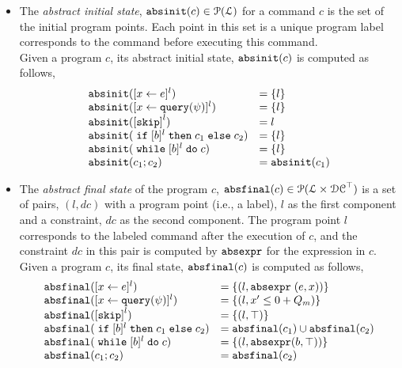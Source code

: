 \begin{itemize}
  \item The \emph{abstract initial state}, $\mathtt{abs}{\mathtt{init}}(c) \in \mathcal{P}(\mathcal{L})$
  for a command $c$ is the set of the initial program points.
Each point in this set is a unique program label corresponds to the command before executing this command. 
\\
Given a program $c$, its abstract initial state, $\mathtt{abs}{\mathtt{init}}(c)$ is computed as follows,
%
\[
  \begin{array}{ll}
    \absinit(\clabel{\assign{x}{\expr}}{}^l)  & = \{l\}  \\
    \absinit(\clabel{\assign{x}{\query(\qexpr)}}{}^l)  & = \{l\} \\
    \absinit(\clabel{\eskip}^{l})  & = l \\
    \absinit(\eif [b]^l \ethen c_1 \eelse c_2)  & = \{l\} \\
    \absinit(\ewhile [b]^l \edo c)  & = \{l\} \\
    \absinit(c_1 ; c_2)  & = \absinit(c_1) \\
 \end{array}
 \]
%
%
\item The \emph{abstract final state} of the program $c$, 
$\mathtt{abs}{\mathtt{final}}(c) \in \mathcal{P}(\mathcal{L} \times \mathcal{DC}^{\top})$
is a set of pairs, $(l, dc)$ with a
program point (i.e., a label), $l$ as the first component and a constraint, 
$dc$ as the second component.
The program point $l$ corresponds to the labeled command after the execution of $c$,
and the constraint $dc$ in this pair is computed by $\mathtt{abs}{\mathtt{expr}}$ for the expression in $c$.
\\
Given a program $c$, its final state, $\mathtt{abs}{\mathtt{final}}(c)$ is computed as follows,
 \[
  \begin{array}{ll}
    \absfinal(\clabel{\assign{x}{\expr}}{}^l)  & = \{(l, \absexpr\eapp (\expr, x))\}  \\
     \absfinal(\clabel{\assign{x}{\query(\qexpr)}}{}^l)  & = \{
      (l, x' \leq 0 + Q_m )\}  \\
     \absfinal(\clabel{\eskip}^{l})  
     & = \{(l, \top)\} \\
     \absfinal(\eif [b]^l \ethen c_1 \eelse c_2)  & = \absfinal(c_1) \cup \absfinal(c_2) \\
     \absfinal(\ewhile [b]^l \edo c)  & = \{(l, \absexpr(\bexpr, \top))\} \\
     \absfinal(c_1 ; c_2)  & =  \absfinal(c_2) \\
 \end{array}
 \]
\end{itemize}
